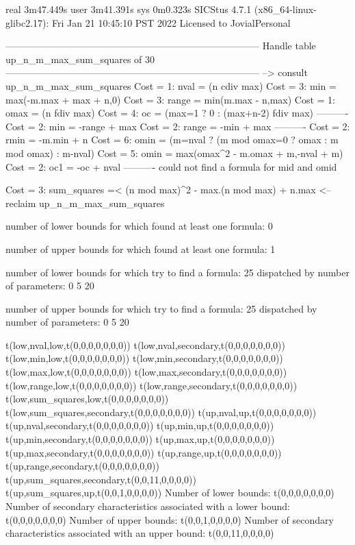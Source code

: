 real	3m47.449s
user	3m41.391s
sys	0m0.323s
SICStus 4.7.1 (x86_64-linux-glibc2.17): Fri Jan 21 10:45:10 PST 2022
Licensed to JovialPersonal


--------------------------------------------------------------------------------
Handle table up_n_m_max_sum_squares of 30
--------------------------------------------------------------------------------
--> consult up_n_m_max_sum_squares
Cost =  1:  nval  = (n cdiv max)
Cost =  3:  min   = max(-m.max + max + n,0)
Cost =  3:  range = min(m.max - n,max)
Cost =  1:  omax  = (n fdiv max)
Cost =  4:  oc    = (max=1 ? 0 : (max+n-2) fdiv max)
----------
Cost =  2:  min   = -range + max
Cost =  2:  range = -min + max
----------
Cost =  2:  rmin  = -m.min + n
Cost =  6:  omin  = (m=nval ? (m mod omax=0 ? omax : m mod omax) : m-nval)
Cost =  5:  omin  = max(omax^2 - m.omax + m,-nval + m)
Cost =  2:  oc1   = -oc + nval
----------
could not find a formula for mid and omid

Cost =  3:  sum_squares =< (n mod max)^2 - max.(n mod max) + n.max
<-- reclaim up_n_m_max_sum_squares

number of lower bounds for which found at least one formula: 0

number of upper bounds for which found at least one formula: 1

number of lower bounds for which try to find a formula: 25
dispatched by number of parameters: 0  5  20

number of upper bounds for which try to find a formula: 25
dispatched by number of parameters: 0  5  20

t(low,nval,low,t(0,0,0,0,0,0,0))
t(low,nval,secondary,t(0,0,0,0,0,0,0))
t(low,min,low,t(0,0,0,0,0,0,0))
t(low,min,secondary,t(0,0,0,0,0,0,0))
t(low,max,low,t(0,0,0,0,0,0,0))
t(low,max,secondary,t(0,0,0,0,0,0,0))
t(low,range,low,t(0,0,0,0,0,0,0))
t(low,range,secondary,t(0,0,0,0,0,0,0))
t(low,sum_squares,low,t(0,0,0,0,0,0,0))
t(low,sum_squares,secondary,t(0,0,0,0,0,0,0))
t(up,nval,up,t(0,0,0,0,0,0,0))
t(up,nval,secondary,t(0,0,0,0,0,0,0))
t(up,min,up,t(0,0,0,0,0,0,0))
t(up,min,secondary,t(0,0,0,0,0,0,0))
t(up,max,up,t(0,0,0,0,0,0,0))
t(up,max,secondary,t(0,0,0,0,0,0,0))
t(up,range,up,t(0,0,0,0,0,0,0))
t(up,range,secondary,t(0,0,0,0,0,0,0))
t(up,sum_squares,secondary,t(0,0,11,0,0,0,0))
t(up,sum_squares,up,t(0,0,1,0,0,0,0))
Number of lower bounds:                                             t(0,0,0,0,0,0,0)
Number of secondary characteristics associated with a lower bound:  t(0,0,0,0,0,0,0)
Number of upper bounds:                                             t(0,0,1,0,0,0,0)
Number of secondary characteristics associated with an upper bound: t(0,0,11,0,0,0,0)

